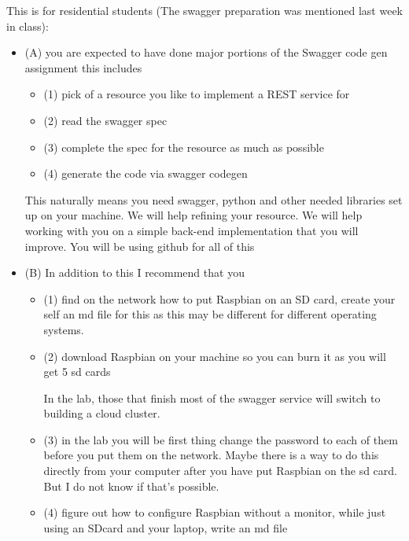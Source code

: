 \begin{exercise}
  This is for residential students (The swagger preparation was
  mentioned last week in class):

 \begin{itemize}

 \item (A) you are expected to have done major portions of the Swagger
   code gen assignment this includes

  \begin{itemize}
  \item (1) pick of a resource you like to implement a REST service
    for
  \item (2) read the swagger spec
  \item (3) complete the spec for the resource as much as possible
  \item (4) generate the code via swagger codegen
  \end{itemize}

  This naturally means you need swagger, python and other needed
  libraries set up on your machine. We will help refining your
  resource. We will help working with you on a simple back-end
  implementation that you will improve. You will be using github for
  all of this

\item (B) In addition to this I recommend that you

  \begin{itemize}

  \item (1) find on the network how to put Raspbian on an SD card,
    create your self an md file for this as this may be different for
    different operating systems.

 
  \item (2) download Raspbian on your machine so you can burn it as you
    will get 5 sd cards
 
    In the lab, those that finish most of the swagger service will
    switch to building a cloud cluster.
 
  \item (3) in the lab you will be first thing change the password to
    each of them before you put them on the network. Maybe there is a
    way to do this directly from your computer after you have put
    Raspbian on the sd card. But I do not know if that's possible.

 
  \item (4) figure out how to configure Raspbian without a monitor,
    while just using an SDcard and your laptop, write an md file


\end{itemize}
\end{itemize}
\end{exercise}
